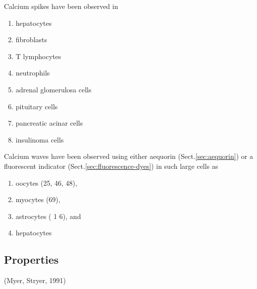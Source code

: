 Calcium spikes have been observed in
\begin{enumerate}
  \item hepatocytes 
  \item fibroblasts
  \item T lymphocytes
  \item neutrophils
  \item adrenal glomerulosa cells
  \item pituitary cells
  \item pancreatic acinar cells
  \item insulinoma cells
\end{enumerate}

Calcium waves have been observed using either aequorin
(Sect.\ref{sec:aequorin}) or a fluorescent indicator (Sect.\ref{sec:fluorescence-dyes}) in
such large cells as
\begin{enumerate}
  \item  oocytes (25, 46, 48), 
  
  \item myocytes (69), 
  
  \item astrocytes ( 1 6), and

  \item hepatocytes
\end{enumerate}

\subsection{Properties} (Myer, Stryer, 1991) 

